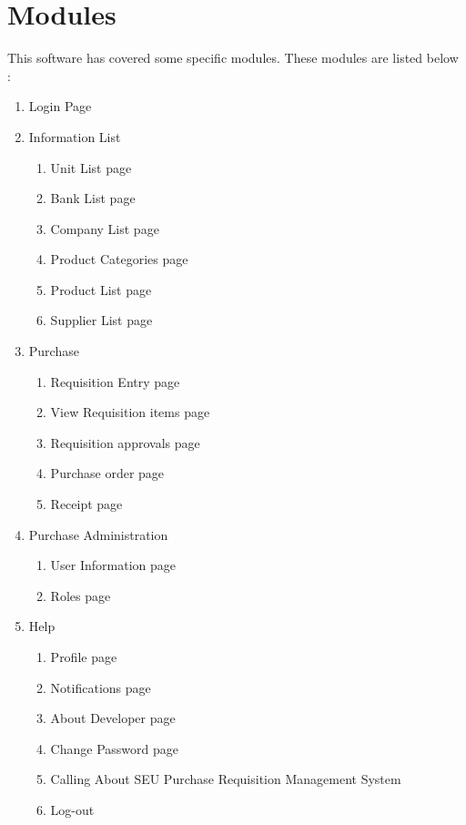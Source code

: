 \documentclass[12pt]{report} %
\begin{document}
\section{Modules}
This software has covered some specific modules. These modules are listed below :
\renewcommand{\labelenumi}{\alph{enumi})}
\begin{enumerate}
		\item Login Page
		
		\item Information List
		\begin{enumerate}
			\item Unit List page
			\item Bank List page	
			\item Company List page
			\item Product Categories page
			\item Product List page
			\item Supplier List page
		\end{enumerate}
		
		\item Purchase
		\begin{enumerate}
			\item Requisition Entry page
			\item View Requisition items page	
			\item Requisition approvals page
			\item Purchase order page
			\item Receipt page
		\end{enumerate}
		
		\item Purchase Administration
		\begin{enumerate}
			\item User Information page
			\item Roles page	
		\end{enumerate}
		
		\item Help
		\begin{enumerate}
			\item Profile page
			\item Notifications page	
			\item About Developer page
			\item Change Password page
			\item Calling About SEU Purchase Requisition Management System
			\item Log-out 
		\end{enumerate}
\end{enumerate}
\end{document}
